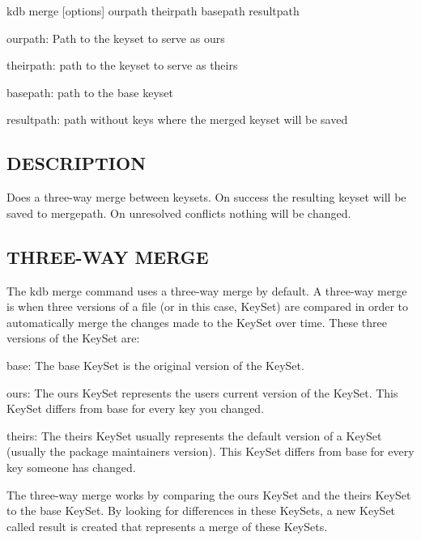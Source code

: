 {\ttfamily kdb merge \mbox{[}options\mbox{]} ourpath theirpath basepath resultpath}


\begin{DoxyItemize}
\item ourpath\+: Path to the keyset to serve as {\ttfamily ours}
\item theirpath\+: path to the keyset to serve as {\ttfamily theirs}
\item basepath\+: path to the {\ttfamily base} keyset
\item resultpath\+: path without keys where the merged keyset will be saved
\end{DoxyItemize}

\subsection*{D\+E\+S\+C\+R\+I\+P\+T\+I\+ON}

Does a three-\/way merge between keysets. On success the resulting keyset will be saved to mergepath. On unresolved conflicts nothing will be changed.

\subsection*{T\+H\+R\+E\+E-\/\+W\+AY M\+E\+R\+GE}

The {\ttfamily kdb merge} command uses a three-\/way merge by default. A three-\/way merge is when three versions of a file (or in this case, Key\+Set) are compared in order to automatically merge the changes made to the Key\+Set over time. These three versions of the Key\+Set are\+:


\begin{DoxyItemize}
\item {\ttfamily base}\+: The {\ttfamily base} Key\+Set is the original version of the Key\+Set.
\item {\ttfamily ours}\+: The {\ttfamily ours} Key\+Set represents the user\textquotesingle{}s current version of the Key\+Set. This Key\+Set differs from {\ttfamily base} for every key you changed.
\item {\ttfamily theirs}\+: The {\ttfamily theirs} Key\+Set usually represents the default version of a Key\+Set (usually the package maintainer\textquotesingle{}s version). This Key\+Set differs from {\ttfamily base} for every key someone has changed.
\end{DoxyItemize}

The three-\/way merge works by comparing the {\ttfamily ours} Key\+Set and the {\ttfamily theirs} Key\+Set to the {\ttfamily base} Key\+Set. By looking for differences in these Key\+Sets, a new Key\+Set called {\ttfamily result} is created that represents a merge of these Key\+Sets.

